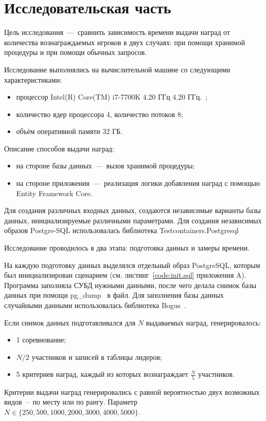 \chapter{Исследовательская часть}
Цель исследования~---~сравнить зависимость времени выдачи наград от количества вознаграждаемых игроков в двух случаях: при помощи хранимой процедуры и при помощи обычных запросов.

Исследование выполнялись на вычислительной машине со следующими характеристиками:
\begin{itemize}
	\item процессор Intel(R) Core(TM) i7-7700K 4.20 ГГц 4.20 ГГц.~\cite{intel};
	\item количество ядер процессора 4, количество потоков 8;
	\item объём оперативной памяти 32 ГБ.
\end{itemize}

Описание способов выдачи наград:
\begin{itemize}
	\item на стороне базы данных~---~вызов хранимой процедуры;
	\item на стороне приложения~---~реализация логики добавления наград с помощью Entity Framework Core.
\end{itemize}

Для создания различных входных данных, создаются независимые варианты базы данных, инициализируемые различными параметрами. Для создания независимых образов Postgre-SQL использовалась библиотека Testcontainers.Postgresql~\cite{testcontainers}

Исследование проводилось в два этапа: подготовка данных и замеры времени.

На каждую подготовку данных выделялся отдельный образ PostgreSQL, которым был инициализирован сценарием (см. листинг~\ref{code:init.sql} приложения A). Программа заполняла СУБД нужными данными, после чего делала снимок базы данных при помощи pg\_dump~\cite{postgresql_pgdump} в файл. Для заполнения базы данных случайными данными использовалась библиотека Bogus~\cite{bogus}.

Если снимок данных подготавливался для $N$ выдаваемых наград, генерировалось:
\begin{itemize}
	\item 1 соревнование;
	\item $N/2$ участников и записей в таблицы лидеров;
	\item 5 критериев наград, каждый из которых вознаграждает $\frac{N}{5}$ участников.
\end{itemize}
Критерии выдачи наград генерировались с равной вероятностью двух возможных видов~--~по месту или по рангу. Параметр $N \in \{250, 500, 1000, 2000, 3000, 4000, 5000\}$.

